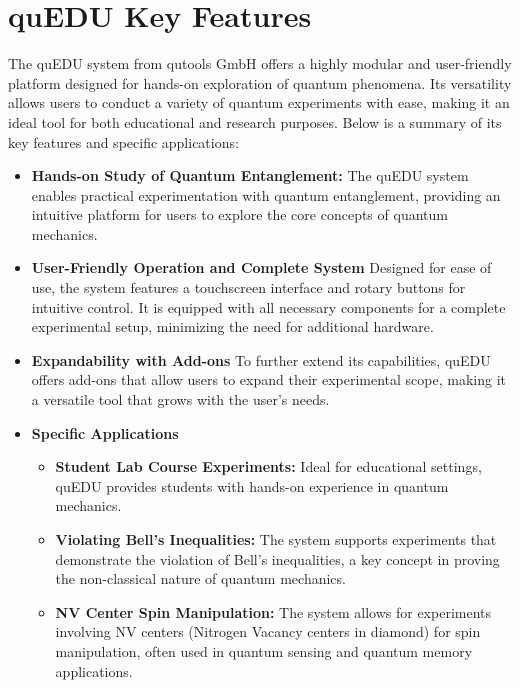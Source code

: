 \section{\acs{quEDU} Key Features}

The \acs{quEDU} system from qutools GmbH offers a highly modular and user-friendly platform designed for hands-on exploration of quantum phenomena. Its versatility allows users to conduct a variety of quantum experiments with ease, making it an ideal tool for both educational and research purposes. Below is a summary of its key features and specific applications:

\begin{itemize}
	\item \textbf{Hands-on Study of Quantum Entanglement: }
	The \acs{quEDU} system enables practical experimentation with quantum entanglement, providing an intuitive platform for users to explore the core concepts of quantum mechanics.
		
	\item \textbf{User-Friendly Operation and Complete System}
	Designed for ease of use, the system features a touchscreen interface and rotary buttons for intuitive control. It is equipped with all necessary components for a complete experimental setup, minimizing the need for additional hardware.
	
	\item \textbf{Expandability with Add-ons}
	To further extend its capabilities, \acs{quEDU} offers add-ons that allow users to expand their experimental scope, making it a versatile tool that grows with the user's needs.
	
	\item \textbf{Specific Applications}
	
	\begin{itemize}
		\item [$\rightarrow$] \textbf{Student Lab Course Experiments: }
		Ideal for educational settings, \acs{quEDU} provides students with hands-on experience in quantum mechanics.
		
		\item [$\rightarrow$] \textbf{Violating Bell's Inequalities: }
		 The system supports experiments that demonstrate the violation of Bell’s inequalities, a key concept in proving the non-classical nature of quantum mechanics.
		 
		 \item[$\rightarrow$] \textbf{NV Center Spin Manipulation: }
		 The system allows for experiments involving NV centers (Nitrogen Vacancy centers in diamond) for spin manipulation, often used in quantum sensing and quantum memory applications.
		 

\end{itemize}
\end{itemize}
